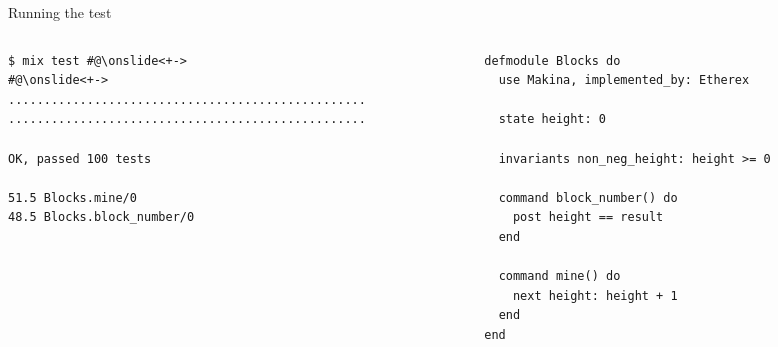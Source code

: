 \documentclass[aspectratio=169, 10pt, handout]{beamer}
\begin{document}
\begin{frame}[label={sec:orgee404b5},fragile]{Running the test}
 \begin{columns}
\begin{column}{0.48\columnwidth}
\lstset{language=bash,label= ,caption= ,captionpos=b,numbers=none,style=shell}
\begin{lstlisting}
$ mix test #@\onslide<+->
#@\onslide<+->
..................................................
..................................................

OK, passed 100 tests

51.5 Blocks.mine/0
48.5 Blocks.block_number/0
\end{lstlisting}
\end{column}

\begin{column}{0.48\columnwidth}
\lstset{language=elixir,label= ,caption= ,captionpos=b,numbers=none,style=display}
\begin{lstlisting}
defmodule Blocks do
  use Makina, implemented_by: Etherex

  state height: 0

  invariants non_neg_height: height >= 0

  command block_number() do
    post height == result
  end

  command mine() do
    next height: height + 1
  end
end
\end{lstlisting}
\end{column}
\end{columns}
\end{frame}
\end{document}
